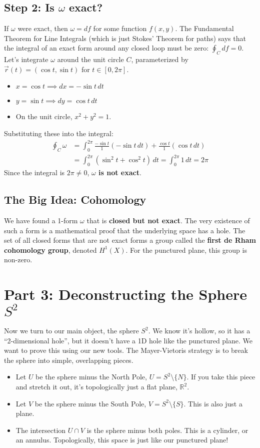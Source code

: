 \documentclass[12pt, letterpaper]{article}
\begin{document}
	\subsection{Step 2: Is $\omega$ exact?}
	If $\omega$ were exact, then $\omega = df$ for some function $f(x,y)$. The Fundamental Theorem for Line Integrals (which is just Stokes' Theorem for paths) says that the integral of an exact form around any closed loop must be zero: $\oint_C df = 0$.
	Let's integrate $\omega$ around the unit circle $C$, parameterized by $\vec{r}(t) = (\cos t, \sin t)$ for $t \in [0, 2\pi]$.
	\begin{itemize}
		\item $x = \cos t \implies dx = -\sin t \, dt$
		\item $y = \sin t \implies dy = \cos t \, dt$
		\item On the unit circle, $x^2+y^2 = 1$.
	\end{itemize}
	Substituting these into the integral:
	\begin{align*}
		\oint_C \omega &= \int_0^{2\pi} \frac{-\sin t}{1}(-\sin t \, dt) + \frac{\cos t}{1}(\cos t \, dt) \\
		&= \int_0^{2\pi} (\sin^2 t + \cos^2 t) \, dt = \int_0^{2\pi} 1 \, dt = 2\pi
	\end{align*}
	Since the integral is $2\pi \neq 0$, \textbf{$\omega$ is not exact}.
	
	\subsection{The Big Idea: Cohomology}
	We have found a 1-form $\omega$ that is \textbf{closed but not exact}. The very existence of such a form is a mathematical proof that the underlying space has a hole. The set of all closed forms that are not exact forms a group called the \textbf{first de Rham cohomology group}, denoted $H^1(X)$. For the punctured plane, this group is non-zero.
	
	\section{Part 3: Deconstructing the Sphere $S^2$}
	Now we turn to our main object, the sphere $S^2$. We know it's hollow, so it has a ``2-dimensional hole'', but it doesn't have a 1D hole like the punctured plane. We want to prove this using our new tools. The Mayer-Vietoris strategy is to break the sphere into simple, overlapping pieces.
	
	\begin{itemize}
		\item Let $U$ be the sphere minus the North Pole, $U = S^2 \setminus \{N\}$. If you take this piece and stretch it out, it's topologically just a flat plane, $\mathbb{R}^2$.
		\item Let $V$ be the sphere minus the South Pole, $V = S^2 \setminus \{S\}$. This is also just a plane.
		\item The intersection $U \cap V$ is the sphere minus both poles. This is a cylinder, or an annulus. Topologically, this space is just like our punctured plane!
	\end{itemize}
	
\end{document}
